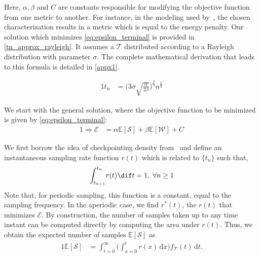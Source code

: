 Here, $\alpha, \beta$ and $C$ are constants responsible for modifying the objective function from one metric to another.
For instance, in the modeling used by~\cite{moothedath2021energy,moothedath2022energy1,moothedath2022energy2}, the chosen characterization results in a metric which is equal to the energy penalty.
Our solution which minimizes \cref{eq:epsilon_terminal} is provided in \cref{tn_approx_rayleigh}.
It assumes a $\mathcal{T}$ distributed according to a Rayleigh distribution with parameter $\sigma$.
The complete mathematical derivation that leads to this formula is detailed in \cref{appx1}.

\begin{alignat}{1}
    t_n&=\Big(3\sigma\!\sqrt{\tfrac{\alpha}{2\beta}}\Big)^{\frac{2}{3}}n^{\frac{2}{3}}\label{tn_approx_rayleigh}
\end{alignat}



We start with the general solution, where the objective function to be minimized is given by \cref{eq:epsilon_terminal}:
\begin{alignat}{1}
    \Rightarrow\mathcal{E}&=\alpha\mathbb{E}[\mathcal{S}]+\beta\mathbb{E}[\mathcal{W}]+C\nonumber
\end{alignat}

We first borrow the idea of checkpointing density from~\cite{satoshi1992optimal} and define an instantaneous sampling rate function $r(t)$ which is related to $\{t_n\}$ such that,
\begin{alignat}{1}
{\int_{t_{n-1}}^{t_n}}r(t)\dif t=1,\;\forall n\geq1\label{rt}
\end{alignat}
Note that, for periodic sampling, this function is a constant, equal to the sampling frequency.
In the aperiodic case, we find $r^*(t)$, the $r(t)$ that minimizes $\mathcal{E}$.
By construction, the number of samples taken up to any time instant can be computed directly by computing the area under $r(t)$.
Thus, we obtain the expected number of samples $\mathbb{E}[\mathcal{S}]$ as
\begin{alignat}{1}
    \mathbb{E}[\mathcal{S}]&=\int_{t=0}^{\infty}\bigg(\!\int_{x=0}^{t}\!\!\!\!r(x)\,\mathrm{d}x\bigg)f_{\mathcal{T}}(t)\,\mathrm{d}t.\label{Es}
\end{alignat}

